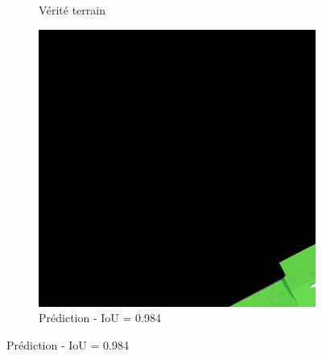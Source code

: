 \begin{figure}[H]
\begin{subfigure}{0.32\textwidth}
    \caption{Vérité terrain}
\end{subfigure}
\hfill
\begin{subfigure}{0.32\textwidth}
    \includegraphics[width=\textwidth]{02-main//figures/ch4/kfold_ensembles/segformer_tu-mambaout_base/best_cases/best_3_iou0.984_24931113_tile_13_18_a66e08_overlay_pred.png}
    \caption{Prédiction - IoU = 0.984}
\end{subfigure}

\vspace{0.35cm}


\end{figure}
